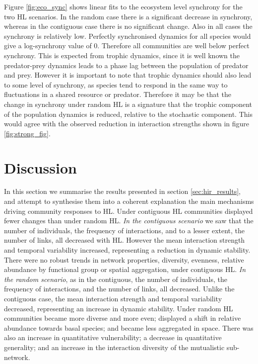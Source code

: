 Figure \ref{fig:eco_sync} shows linear fits to the ecosystem level synchrony for the two HL scenarios. In the random case there is a significant decrease in synchrony, whereas in the contiguous case there is no significant change. Also in all cases the synchrony is relatively low. Perfectly synchronised dynamics for all species would give a log-synchrony value of 0. Therefore all communities are well below perfect synchrony. This is expected from trophic dynamics, since it is well known the predator-prey dynamics leads to a phase lag between the population of predator and prey. However it is important to note that trophic dynamics should also lead to some level of synchrony, as species tend to respond in the same way to fluctuations in a shared resource or predator. Therefore it may be that the change in synchrony under random HL is a signature that the trophic component of the population dynamics is reduced, relative to the stochastic component. This would agree with the observed reduction in interaction strengths shown in figure \ref{fig:strong_fig}.    

\clearpage
\section{Discussion}
\label{sec:res_synthesis}

In this section we summarise the results presented in section \ref{sec:hir_results}, and attempt to synthesise them into a coherent explanation the main mechanisms driving community responses to HL. Under contiguous HL communities displayed fewer changes than under random HL. \emph{In the contiguous scenario} we saw that the number of individuals,  the frequency of interactions, and to a lesser extent, the number of links, all decreased with HL. However the mean interaction strength and temporal variability increased, representing a reduction in dynamic stability. There were no robust trends in network properties, diversity, evenness, relative abundance by functional group or spatial aggregation, under contiguous HL. \emph{In the random scenario}, as in the contiguous, the number of individuals, the frequency of interactions, and the number of links, all decreased. Unlike the contiguous case, the mean interaction strength and temporal variability decreased, representing an increase in dynamic stability. Under random HL communities became more diverse and more even; displayed a shift in relative abundance towards basal species; and became less aggregated in space. There was also an increase in quantitative vulnerability; a decrease in quantitative generality; and an increase in the interaction diversity of the mutualistic sub-network.

